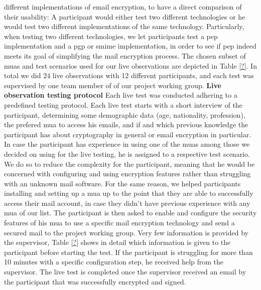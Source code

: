 different implementations of \acrshort{email} encryption, to have a direct comparison of their usability:
A participant would either test two different technologies or he would test two different implementations of the same technology. Particularly, when testing two different technologies, we let participants test a \acrshort{pep} implementation and a \acrshort{pgp} or \acrshort{smime} implementation, in order to see if \acrshort{pep} indeed meets its goal of simplifying the mail encryption process.
The chosen subset of \acrshort{mua}s and test scenarios used for our live observations are depicted in Table \ref{?}. In total we did 24 live observations with 12 different participants, and each test was supervised by one team member of of our project working group.
\newline
\newline
\textbf{Live observation testing protocol}
\newline
Each live test was conducted adhering to a predefined testing protocol. Each live test starts with a short interview of the participant, determining some demographic data (age, nationality, profession), the prefered \acrshort{mua} to access his \acrshort{email}s, and if and which previous knowledge the participant has about cryptography in general or email encryption in particular. In case the participant has experience in using one of the \acrshort{mua}s among those we decided on using for the live testing, he is assigned to a respective test scenario. We do so to reduce the complexity for the participant, meaning that he would be concerned with configuring and using encryption features rather than struggling with an unknown mail software. For the same reason, we helped participants installing and setting up a \acrshort{mua} up to the point that they are able to successfully access their mail account, in case they didn’t have previous experience with any \acrshort{mua} of our list. The participant is then asked to enable and configure the security features of his \acrshort{mua} to use a specific mail encryption technology and send a secured mail to the project working group. Very few information is provided by the supervisor, Table \ref{?} shows in detail which information is given to the participant before starting the test. If the participant is struggling for more than 10 minutes with a specific configuration step, he received help from the supervisor. The live test is completed once the supervisor received an \acrshort{email} by the participant that was successfully encrypted and signed.